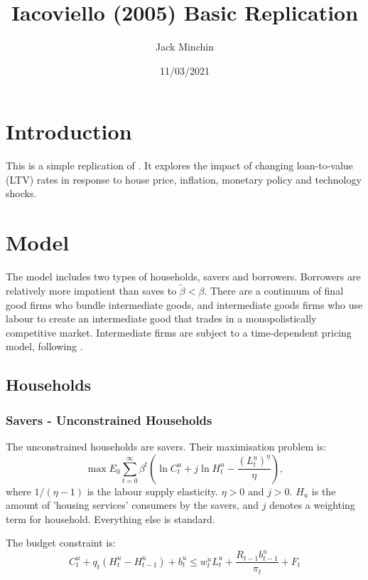 \documentclass[11pt, a4paper]{article}
\begin{document}
\title{Iacoviello (2005) Basic Replication}
\author{Jack Minchin}
\date{11/03/2021}
\maketitle


\section{Introduction}

This is a simple replication of \cite{10.1257/0002828054201477}. It explores the impact of changing loan-to-value (LTV) rates in response to house price, inflation, monetary policy and technology shocks. 

	\section{Model}
	
	The model includes two types of households, savers and borrowers. Borrowers are relatively more impatient than saves to $\tilde\beta < \beta$. There are a continuum of final good firms who bundle intermediate goods, and intermediate goods firms who use labour to create an intermediate good that trades in a monopolistically competitive market. Intermediate firms are subject to a  time-dependent pricing model, following \cite{Calvo1983}.
	
	\subsection{Households}
	
	\subsubsection{Savers - Unconstrained Households}
	
	The unconstrained households are savers. Their maximisation problem is:
	\begin{equation}
\max E_{0} \sum_{t=0}^{\infty} \beta^{t}\left(\ln C_{t}^{u}+j \ln H_{t}^{u}-\frac{\left(L_{t}^{u}\right)^{\eta}}{\eta}\right),
\end{equation}
where $1 / (\eta -1)$ is the labour supply elasticity. $\eta > 0$ and $j >0$. $H_u$ is the amount of 'housing services' consumers by the savers, and $j$ denotes a weighting term for household. Everything else is standard.

The budget constraint is:
\begin{equation}
C_{t}^{u}+q_{t}\left(H_{t}^{u}-H_{t-1}^{u}\right)+b_{t}^{u} \leq w_{t}^{u} L_{t}^{u}+\frac{R_{t-1} b_{t-1}^{u}}{\pi_{t}}+F_{t}
\end{equation}
\end{document}
